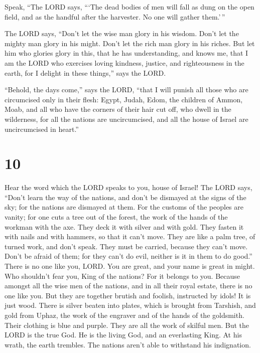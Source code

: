  Speak, ``The LORD says, ```The dead bodies of men will
fall as dung on the open field, and as the handful after the harvester.
No one will gather them.'\,''

 The LORD says, ``Don't let the wise man glory in his
wisdom. Don't let the mighty man glory in his might. Don't let the rich
man glory in his riches.  But let him who glories glory in
this, that he has understanding, and knows me, that I am the LORD who
exercises loving kindness, justice, and righteousness in the earth, for
I delight in these things,'' says the LORD.

 ``Behold, the days come,'' says the LORD, ``that I will
punish all those who are circumcised only in their flesh: 
Egypt, Judah, Edom, the children of Ammon, Moab, and all who have the
corners of their hair cut off, who dwell in the wilderness, for all the
nations are uncircumcised, and all the house of Israel are uncircumcised
in heart.''

\hypertarget{section-9}{%
\section{10}\label{section-9}}

 Hear the word which the LORD speaks to you, house of
Israel!  The LORD says, ``Don't learn the way of the
nations, and don't be dismayed at the signs of the sky; for the nations
are dismayed at them.  For the customs of the peoples are
vanity; for one cuts a tree out of the forest, the work of the hands of
the workman with the axe.  They deck it with silver and with
gold. They fasten it with nails and with hammers, so that it can't move.
 They are like a palm tree, of turned work, and don't speak.
They must be carried, because they can't move. Don't be afraid of them;
for they can't do evil, neither is it in them to do good.'' 
There is no one like you, LORD. You are great, and your name is great in
might.  Who shouldn't fear you, King of the nations? For it
belongs to you. Because amongst all the wise men of the nations, and in
all their royal estate, there is no one like you.  But they
are together brutish and foolish, instructed by idols! It is just wood.
 There is silver beaten into plates, which is brought from
Tarshish, and gold from Uphaz, the work of the engraver and of the hands
of the goldsmith. Their clothing is blue and purple. They are all the
work of skilful men.  But the LORD is the true God. He is
the living God, and an everlasting King. At his wrath, the earth
trembles. The nations aren't able to withstand his indignation.

